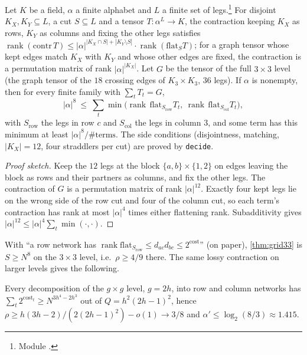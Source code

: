 \documentclass[10pt]{amsart}
\theoremstyle{plain}
\theoremstyle{definition}
\theoremstyle{remark}
\numberwithin{equation}{section}
\newcommand{\rk}{\operatorname{rank}}
\newcommand{\cost}{\operatorname{cost}}
\begin{document}
\begin{theorem}\label{thm:grid33}
Let $K$ be a field, $\alpha$ a finite alphabet and $L$ a finite set of legs.\footnote{Module
.} For disjoint $K_X,K_Y\subseteq L$, a cut
$S\subseteq L$ and a tensor $T:\alpha^L\to K$, the contraction keeping $K_X$ as rows, $K_Y$ as columns
and fixing the other legs satisfies
$\rk(\mathrm{contr}\,T)\le|\alpha|^{|K_X\cap S|+|K_Y\setminus S|}\cdot\rk(\mathrm{flat}_ST)$; for a graph
tensor whose kept edges match $K_X$ with $K_Y$ and whose other edges are fixed, the contraction is a
permutation matrix of rank $|\alpha|^{|K_X|}$. Let $G$ be the tensor of the full $3\times3$ level (the
graph tensor of the $18$ crossing edges of $K_3\times K_3$, $36$ legs). If $\alpha$ is nonempty, then for
every finite family with $\sum_tT_t=G$,
\[
  |\alpha|^8\ \le\ \sum_t\min\bigl(\rk\,\mathrm{flat}_{S_{\mathrm{row}}}T_t,\ \rk\,\mathrm{flat}_{S_{\mathrm{col}}}T_t\bigr),
\]
with $S_{\mathrm{row}}$ the legs in row $c$ and $S_{\mathrm{col}}$ the legs in column $3$, and some term has this
minimum at least $|\alpha|^8/\#\text{terms}$. The side conditions (disjointness, matching, $|K_X|=12$,
four straddlers per cut) are proved by \texttt{decide}.
\end{theorem}
\begin{proof}[Proof sketch]
Keep the $12$ legs at the block $\{a,b\}\times\{1,2\}$ on edges leaving the block as rows and their
partners as columns, and fix the other legs. The contraction of $G$ is a permutation matrix of rank
$|\alpha|^{12}$. Exactly four kept legs lie on the wrong side of the row cut and four of the column cut,
so each term's contraction has rank at most $|\alpha|^4$ times either flattening rank. Subadditivity gives
$|\alpha|^{12}\le|\alpha|^4\sum_t\min(\cdot,\cdot)$.
\end{proof}

\noindent With ``a row network has $\rk\mathrm{flat}_{S_{\mathrm{row}}}\le d_{ac}d_{bc}\le2^{\cost}$''
(on paper), \cref{thm:grid33} is $S\ge N^8$ on the $3\times3$ level, i.e.\ $\rho\ge4/9$ there. The same
lossy contraction on larger levels gives the following.

\begin{proposition}\label{prop:fulllevel}
Every decomposition of the $g\times g$ level, $g=2h$, into row and column networks has
$\sum_t2^{\cost_t}\ge N^{3h^4-2h^3}$ out of $Q=h^2(2h-1)^2$, hence
$\rho\ge h(3h-2)/(2(2h-1)^2)-o(1)\to3/8$ and $\alpha'\le\log_2(8/3)\approx1.415$.
\end{proposition}
\end{document}
